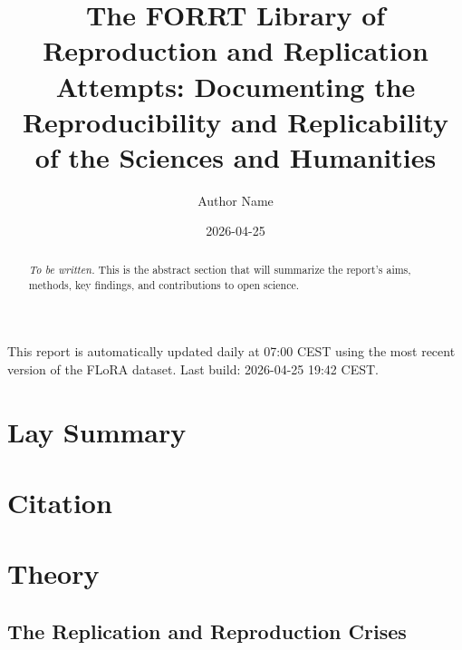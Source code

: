 \documentclass[
  11pt,
  a4paper,
]{article}
\title{The FORRT Library of Reproduction and Replication Attempts:
Documenting the Reproducibility and Replicability of the Sciences and
Humanities}
\author{Author Name}
\date{2026-04-25}
\renewcommand*\contentsname{Table of contents}
\newcommand\contentsname{Table of contents}
\begin{document}
\maketitle
\begin{abstract}
\emph{To be written.} This is the abstract section that will summarize
the report's aims, methods, key findings, and contributions to open
science.
\end{abstract}

\renewcommand*\contentsname{Table of contents}
{
\hypersetup{linkcolor=}
\setcounter{tocdepth}{3}
\tableofcontents
}

\begin{tcolorbox}[enhanced jigsaw, colback=white, breakable, opacityback=0, colframe=quarto-callout-note-color-frame, arc=.35mm, leftrule=.75mm, rightrule=.15mm, bottomrule=.15mm, toprule=.15mm, left=2mm]
\begin{minipage}[t]{5.5mm}
\textcolor{quarto-callout-note-color}{\faInfo}
\end{minipage}%
\begin{minipage}[t]{\textwidth - 5.5mm}

This report is automatically updated daily at 07:00 CEST using the most
recent version of the FLoRA dataset. Last build: 2026-04-25 19:42 CEST.

\end{minipage}%
\end{tcolorbox}

\section*{Lay Summary}\label{sec-lay-summary}

\section*{Citation}\label{sec-citation}

\section{Theory}\label{sec-theory}

\subsection{The Replication and Reproduction
Crises}\label{the-replication-and-reproduction-crises}
\end{document}
